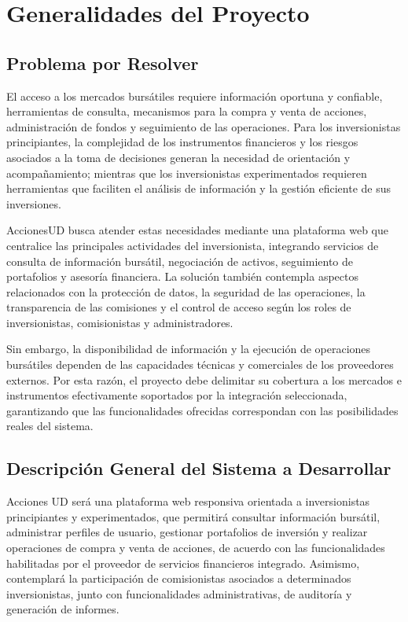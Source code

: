 \documentclass[11pt,a4paper,oneside]{article}
\newcommand{\nombreSolucion}{Acciones UD}
\begin{document}
\section{Generalidades del Proyecto}

\subsection{Problema por Resolver}

El acceso a los mercados bursátiles requiere información oportuna y confiable, herramientas de consulta, mecanismos para la compra y venta de acciones, administración de fondos y seguimiento de las operaciones. Para los inversionistas principiantes, la complejidad de los instrumentos financieros y los riesgos asociados a la toma de decisiones generan la necesidad de orientación y acompañamiento; mientras que los inversionistas experimentados requieren herramientas que faciliten el análisis de información y la gestión eficiente de sus inversiones.

AccionesUD busca atender estas necesidades mediante una plataforma web que centralice las principales actividades del inversionista, integrando servicios de consulta de información bursátil, negociación de activos, seguimiento de portafolios y asesoría financiera. La solución también contempla aspectos relacionados con la protección de datos, la seguridad de las operaciones, la transparencia de las comisiones y el control de acceso según los roles de inversionistas, comisionistas y administradores.

Sin embargo, la disponibilidad de información y la ejecución de operaciones bursátiles dependen de las capacidades técnicas y comerciales de los proveedores externos. Por esta razón, el proyecto debe delimitar su cobertura a los mercados e instrumentos efectivamente soportados por la integración seleccionada, garantizando que las funcionalidades ofrecidas correspondan con las posibilidades reales del sistema.

\subsection{Descripción General del Sistema a Desarrollar}

\nombreSolucion{} será una plataforma web responsiva orientada a inversionistas principiantes y experimentados, que permitirá consultar información bursátil, administrar perfiles de usuario, gestionar portafolios de inversión y realizar operaciones de compra y venta de acciones, de acuerdo con las funcionalidades habilitadas por el proveedor de servicios financieros integrado. Asimismo, contemplará la participación de comisionistas asociados a determinados inversionistas, junto con funcionalidades administrativas, de auditoría y generación de informes.
\end{document}
